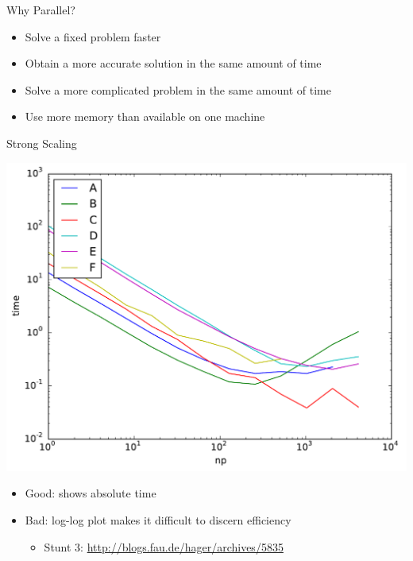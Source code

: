 \begin{frame}{Why Parallel?}
  \begin{itemize}
  \item Solve a fixed problem faster
  \item Obtain a more accurate solution in the same amount of time
  \item Solve a more complicated problem in the same amount of time
  \item Use more memory than available on one machine
  \end{itemize}
\end{frame}

\begin{frame}{Strong Scaling}
  \begin{center}
    \includegraphics[width=.8\textwidth]{figures/olenz/olenz-time-np}
  \end{center}
  \begin{itemize}
  \item Good: shows absolute time
  \item Bad: log-log plot makes it difficult to discern efficiency
    \begin{itemize}
    \item Stunt 3: \url{http://blogs.fau.de/hager/archives/5835}
    \end{itemize}
  \end{itemize}
\end{frame}

